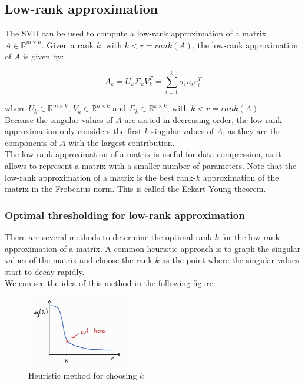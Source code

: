\subsection{Low-rank approximation}

The SVD can be used to compute a low-rank approximation of a matrix $A \in \mathbb{R}^{m \times n}$. Given a rank $k$, with $k < r = rank(A)$,
the low-rank approximation of $A$ is given by:

\begin{equation}
    A_k = U_k \Sigma_k V_k^T = \sum_{i=1}^{k} \sigma_i u_i v_i^T
\end{equation}

where $U_k \in \mathbb{R}^{m \times k}$, $V_k \in \mathbb{R}^{n \times k}$ and $\Sigma_k \in \mathbb{R}^{k \times k}$, with $k < r = rank(A)$.\\

Because the singular values of $A$ are sorted in decreasing order, the low-rank approximation only considers the first $k$ singular values of $A$,
as they are the components of $A$ with the largest contribution.\\

The low-rank approximation of a matrix is useful for data compression, as it allows to represent a matrix with a smaller number of parameters. 
Note that the low-rank approximation of a matrix is the best rank-$k$ approximation of the matrix in the Frobenius norm. This is called 
the Eckart-Young theorem.

\subsubsection{Optimal thresholding for low-rank approximation}

There are several methods to determine the optimal rank $k$ for the low-rank approximation of a matrix. A common heuristic approach
is to graph the singular values of the matrix and choose the rank $k$ as the point where the singular values start to decay rapidly.\\

We can see the idea of this method in the following figure:\\

\begin{figure}[H]
    \centering
    \includegraphics[width=0.4\textwidth]{figures/image_opt_thresh_1.jpg}
    \caption{Heuristic method for choosing $k$}
    \label{fig:heur_k_choose}
\end{figure}

